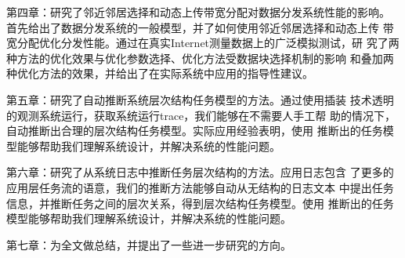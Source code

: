   第四章：研究了邻近邻居选择和动态上传带宽分配对数据分发系统性能的影响。
  首先给出了数据分发系统的一般模型，并了如何使用邻近邻居选择和动态上传
  带宽分配优化分发性能。通过在真实Internet测量数据上的广泛模拟测试，研
  究了两种方法的优化效果与优化参数选择、优化方法受数据块选择机制的影响
  和叠加两种优化方法的效果，并给出了在实际系统中应用的指导性建议。

  第五章：研究了自动推断系统层次结构任务模型的方法。通过使用插装
  技术透明的观测系统运行，获取系统运行trace，我们能够在不需要人手工帮
  助的情况下，自动推断出合理的层次结构任务模型。实际应用经验表明，使用
  推断出的任务模型能够帮助我们理解系统设计，并解决系统的性能问题。

  第六章：研究了从系统日志中推断任务层次结构的方法。应用日志包含
  了更多的应用层任务流的语意，我们的推断方法能够自动从无结构的日志文本
  中提出任务信息，并推断任务之间的层次关系，得到层次结构任务模型。使用
  推断出的任务模型能够帮助我们理解系统设计，并解决系统的性能问题。

  第七章：为全文做总结，并提出了一些进一步研究的方向。


